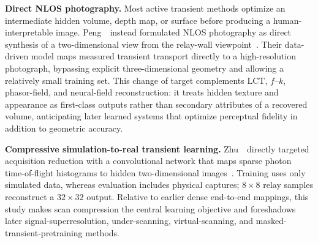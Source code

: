 \vspace{0.8mm}
\noindent \textbf{Direct NLOS photography.}
Most active transient methods optimize an intermediate hidden volume, depth map, or surface before producing a human-interpretable image. Peng~\etal~instead formulated NLOS photography as direct synthesis of a two-dimensional view from the relay-wall viewpoint~\cite{pengTowardsNLOSPhotography2021}. Their data-driven model maps measured transient transport directly to a high-resolution photograph, bypassing explicit three-dimensional geometry and allowing a relatively small training set. This change of target complements LCT, $f$--$k$, phasor-field, and neural-field reconstruction: it treats hidden texture and appearance as first-class outputs rather than secondary attributes of a recovered volume, anticipating later learned systems that optimize perceptual fidelity in addition to geometric accuracy.

\vspace{0.8mm}
\noindent \textbf{Compressive simulation-to-real transient learning.}
Zhu~\etal~directly targeted acquisition reduction with a convolutional network that maps sparse photon time-of-flight histograms to hidden two-dimensional images~\cite{zhuCompressiveNLOSDeepLearning2023}. Training uses only simulated data, whereas evaluation includes physical captures; $8\times8$ relay samples reconstruct a $32\times32$ output. Relative to earlier dense end-to-end mappings, this study makes scan compression the central learning objective and foreshadows later signal-superresolution, under-scanning, virtual-scanning, and masked-transient-pretraining methods.

